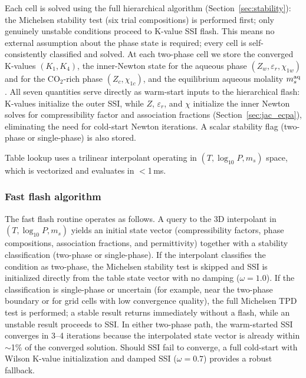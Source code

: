 \documentclass[preprint,12pt,authoryear]{elsarticle}
\begin{document}
Each cell is solved using the full hierarchical algorithm
(Section~\ref{sec:stability}): the Michelsen stability test (six trial compositions)
is performed first; only genuinely unstable conditions proceed to K-value SSI flash.
This means no external assumption about the phase state is required; every cell is
self-consistently classified and solved.
At each two-phase cell we store the converged K-values $(K_1, K_4)$, the
inner-Newton state for the aqueous phase $(Z_w, \varepsilon_r, \chi_{1w})$
and for the CO$_2$-rich phase $(Z_c, \chi_{1c})$, and the equilibrium
aqueous molality $m_s^{\rm aq}$.
All seven quantities serve directly as warm-start inputs to the hierarchical
flash: K-values initialize the outer SSI, while $Z$, $\varepsilon_r$, and
$\chi$ initialize the inner Newton solves for compressibility factor and
association fractions (Section~\ref{sec:jac_ecpa}), eliminating the need for
cold-start Newton iterations.
A scalar stability flag (two-phase or single-phase) is also stored.

Table lookup uses a trilinear interpolant operating in $(T, \log_{10}P, m_s)$ space,
which is vectorized and evaluates in $<$1\,ms.

\subsubsection{Fast flash algorithm}
\label{sec:algorithm}

The fast flash routine operates as follows.
A query to the 3D interpolant in $(T, \log_{10}P, m_s)$ yields an initial state vector (compressibility factors, phase
compositions, association fractions, and permittivity) together with a stability classification
(two-phase or single-phase).
If the interpolant classifies the condition as two-phase, the Michelsen stability test is
skipped and SSI is initialized directly from the table state vector with no damping ($\omega = 1.0$).
If the classification is single-phase or uncertain (for example, near the two-phase boundary
or for grid cells with low convergence quality), the full Michelsen TPD test is performed;
a stable result returns immediately without a flash, while an unstable result proceeds to SSI.
In either two-phase path, the warm-started SSI converges in 3--4 iterations because the
interpolated state vector is already within $\sim$1\% of the converged solution.
Should SSI fail to converge, a full cold-start with Wilson K-value initialization and damped
SSI ($\omega = 0.7$) provides a robust fallback.
\end{document}
